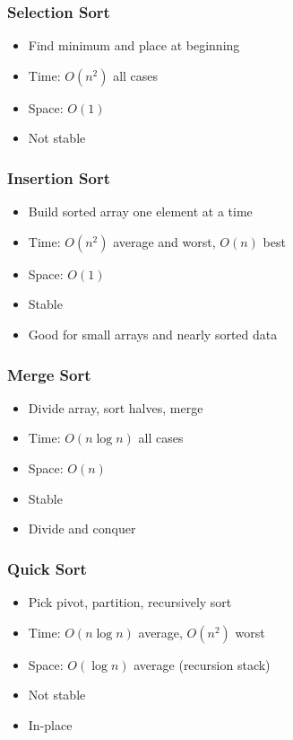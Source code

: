 \documentclass[11pt,a4paper]{article}
\begin{document}
\subsubsection{Selection Sort}
\begin{itemize}
    \item Find minimum and place at beginning
    \item Time: $O(n^2)$ all cases
    \item Space: $O(1)$
    \item Not stable
\end{itemize}

\subsubsection{Insertion Sort}
\begin{itemize}
    \item Build sorted array one element at a time
    \item Time: $O(n^2)$ average and worst, $O(n)$ best
    \item Space: $O(1)$
    \item Stable
    \item Good for small arrays and nearly sorted data
\end{itemize}

\subsubsection{Merge Sort}
\begin{itemize}
    \item Divide array, sort halves, merge
    \item Time: $O(n \log n)$ all cases
    \item Space: $O(n)$
    \item Stable
    \item Divide and conquer
\end{itemize}

\subsubsection{Quick Sort}
\begin{itemize}
    \item Pick pivot, partition, recursively sort
    \item Time: $O(n \log n)$ average, $O(n^2)$ worst
    \item Space: $O(\log n)$ average (recursion stack)
    \item Not stable
    \item In-place
\end{itemize}
\end{document}
